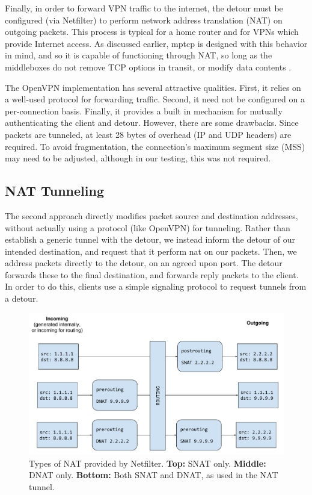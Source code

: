 \documentclass{cwru}
\begin{document}
Finally, in order to forward VPN traffic to the internet, the detour must be
configured (via Netfilter) to perform network address translation (NAT) on
outgoing packets. This process is typical for a home router and for VPNs which
provide Internet access. As discussed earlier, \ac{mptcp} is designed with this
behavior in mind, and so it is capable of functioning through NAT, so long as
the middleboxes do not remove TCP options in transit, or modify data contents
\cite{rfc6182}.

The OpenVPN implementation has several attractive qualities. First, it relies on
a well-used protocol for forwarding traffic. Second, it need not be configured
on a per-connection basis. Finally, it provides a built in mechanism for
mutually authenticating the client and detour. However, there are some
drawbacks. Since packets are tunneled, at least 28 bytes of overhead (IP and UDP
headers) are required. To avoid fragmentation, the connection's maximum segment
size (MSS) may need to be adjusted, although in our testing, this was not
required.

\subsection{NAT Tunneling}

The second approach directly modifies packet source and destination addresses,
without actually using a protocol (like OpenVPN) for tunneling. Rather than
establish a generic tunnel with the detour, we instead inform the detour of our
intended destination, and request that it perform \ac{nat} on our packets. Then,
we address packets directly to the detour, on an agreed upon port. The detour
forwards these to the final destination, and forwards reply packets to the
client. In order to do this, clients use a simple signaling protocol to request
tunnels from a detour.

\begin{figure}
  \centering
  \includegraphics[height=0.3\textheight]{figures/NATTypes.pdf}
  \caption[Types of NAT provided by Netfilter]{Types of NAT provided by
    Netfilter. \textbf{Top:} SNAT only. \textbf{Middle:} DNAT only.
    \textbf{Bottom:} Both SNAT and DNAT, as used in the NAT tunnel.}
  \label{fig:NATTypes}
\end{figure}
\end{document}
